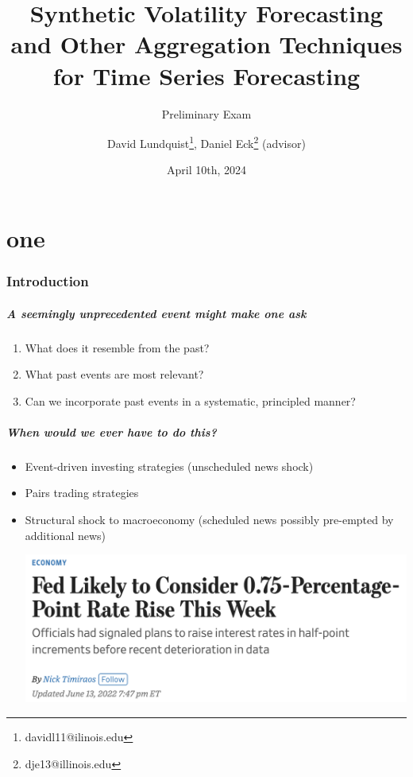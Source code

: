 \documentclass[9pt]{beamer}
\title{Synthetic Volatility Forecasting and Other Aggregation Techniques for Time Series Forecasting}
\subtitle{Preliminary Exam}
\author{David Lundquist\thanks{davidl11@ilinois.edu}, Daniel Eck\thanks{dje13@illinois.edu} (advisor)}
\date{April 10th, 2024}
\theoremstyle{definition}
\begin{document}
\part{one}
\begin{frame}
\titlepage
\end{frame}

\section{Introduction}

\begin{frame}
\frametitle{A seemingly unprecedented event might make one ask}
\begin{enumerate}
    \item What does it resemble from the past?
    \item What past events are most relevant?
    \item Can we incorporate past events in a systematic, principled manner?
\end{enumerate}
\end{frame}

\begin{frame}
    \frametitle{When would we ever have to do this?}

    \begin{itemize}
        \item <1-> Event-driven investing strategies (unscheduled news shock)
        \item <2-> Pairs trading strategies
        \item <3-> Structural shock to macroeconomy (scheduled news possibly pre-empted by additional news)
        

        \href{https://www.wsj.com/articles/bad-inflation-reports-raise-odds-of-surprise-0-75-percentage-point-rate-rise-this-week-11655147927}{\includegraphics[scale=.3]{WSJ_rate_hike_2022.png}}
    \end{itemize}
\end{frame}
\end{document}
